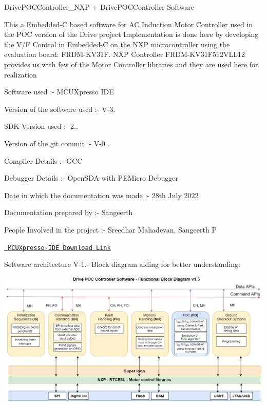 \label{index_md_README}%
%
 Drive\+POCController\+\_\+\+NXP + Drive\+POCController Software

This a Embedded-\/C based software for AC Induction Motor Controller used in the POC version of the Drive project Implementation is done here by developing the V/F Control in Embedded-\/C on the NXP microcontroller using the evaluation board\+: FRDM-\/\+KV31F. NXP Controller FRDM-\/\+KV31\+F512\+VLL12 provides us with few of the Motor Controller libraries and they are used here for realization



Software used \+:-\/ MCUXpresso IDE

Version of the software used \+:-\/ V-\/3.

SDK Version used \+:-\/ 2..

Version of the git commit \+:-\/ V-\/0..

Compiler Details \+:-\/ GCC

Debugger Details \+:-\/ Open\+SDA with PEMicro Debugger

Date in which the documentation was made \+:-\/ 28th July 2022

Documentation prepared by \+:-\/ Sangeerth

People Involved in the project \+:-\/ Sreedhar Mahadevan, Sangeerth P

\href{https://www.nxp.com/design/software/development-software/mcuxpresso-software-and-tools-/mcuxpresso-integrated-development-environment-ide:MCUXpresso-IDE}{\texttt{ MCUXpresso-\/\+IDE Download Link}}



Software architecture V-\/1.-\/ Block diagram aiding for better understanding\+:


\begin{DoxyInlineImage}
\includegraphics[height=\baselineskip,keepaspectratio=true]{software_func_block_dia.jpg}%
\end{DoxyInlineImage}



